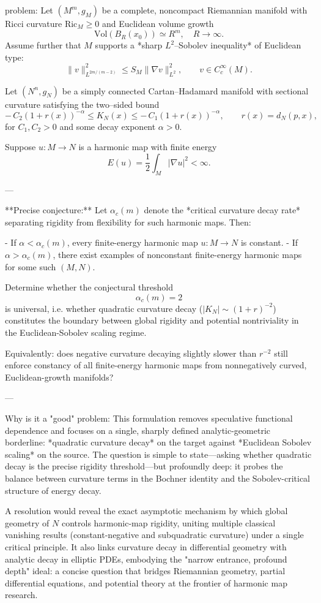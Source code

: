 problem:  
Let \((M^m,g_M)\) be a complete, noncompact Riemannian manifold with Ricci curvature \(\mathrm{Ric}_M \ge 0\) and Euclidean volume growth  
\[
\mathrm{Vol}(B_R(x_0)) \simeq R^m,\quad R\to\infty.
\]  
Assume further that \(M\) supports a *sharp \(L^2\)–Sobolev inequality* of Euclidean type:
\[
\|v\|_{L^{2m/(m-2)}}^2 \le S_M\|\nabla v\|_{L^2}^2,\qquad v\in C_c^\infty(M).
\]

Let \((N^n,g_N)\) be a simply connected Cartan–Hadamard manifold with sectional curvature satisfying the two–sided bound
\[
-\,C_2 (1+r(x))^{-\alpha} \leq K_N(x) \leq -\,C_1 (1+r(x))^{-\alpha}, 
\qquad r(x)=d_N(p,x),
\]
for \(C_1,C_2>0\) and some decay exponent \(\alpha>0\).

Suppose \(u:M\to N\) is a harmonic map with finite energy
\[
E(u)=\frac{1}{2}\int_M |\nabla u|^2 < \infty.
\]

---

**Precise conjecture:**  
Let \(\alpha_c(m)\) denote the *critical curvature decay rate* separating rigidity from flexibility for such harmonic maps. Then:

- If \(\alpha < \alpha_c(m)\), every finite-energy harmonic map \(u:M\to N\) is constant.  
- If \(\alpha > \alpha_c(m)\), there exist examples of nonconstant finite-energy harmonic maps for some such \((M,N)\).

Determine whether the conjectural threshold
\[
\boxed{\alpha_c(m) = 2}
\]
is universal, i.e. whether quadratic curvature decay (\(|K_N|\sim (1+r)^{-2}\)) constitutes the boundary between global rigidity and potential nontriviality in the Euclidean-Sobolev scaling regime.

Equivalently: does negative curvature decaying slightly slower than \(r^{-2}\) still enforce constancy of all finite-energy harmonic maps from nonnegatively curved, Euclidean-growth manifolds?

---

Why is it a "good" problem:  
This formulation removes speculative functional dependence and focuses on a single, sharply defined analytic-geometric borderline: *quadratic curvature decay* on the target against *Euclidean Sobolev scaling* on the source. The question is simple to state—asking whether quadratic decay is the precise rigidity threshold—but profoundly deep: it probes the balance between curvature terms in the Bochner identity and the Sobolev-critical structure of energy decay.  

A resolution would reveal the exact asymptotic mechanism by which global geometry of \(N\) controls harmonic-map rigidity, uniting multiple classical vanishing results (constant-negative and subquadratic curvature) under a single critical principle. It also links curvature decay in differential geometry with analytic decay in elliptic PDEs, embodying the "narrow entrance, profound depth" ideal: a concise question that bridges Riemannian geometry, partial differential equations, and potential theory at the frontier of harmonic map research.